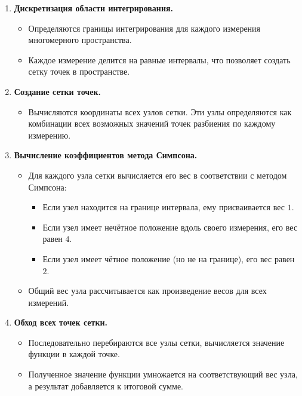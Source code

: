 \documentclass{report}
\begin{document}
\begin{enumerate}
    \item \textbf{Дискретизация области интегрирования.}
    \begin{itemize}
        \item Определяются границы интегрирования для каждого измерения многомерного пространства.
        \item Каждое измерение делится на равные интервалы, что позволяет создать сетку точек в пространстве.
    \end{itemize}

    \item \textbf{Создание сетки точек.}
    \begin{itemize}
        \item Вычисляются координаты всех узлов сетки. Эти узлы определяются как комбинации всех возможных значений точек разбиения по каждому измерению.
    \end{itemize}

    \item \textbf{Вычисление коэффициентов метода Симпсона.}
    \begin{itemize}
        \item Для каждого узла сетки вычисляется его вес в соответствии с методом Симпсона:
        \begin{itemize}
            \item Если узел находится на границе интервала, ему присваивается вес \( 1 \).
            \item Если узел имеет нечётное положение вдоль своего измерения, его вес равен \( 4 \).
            \item Если узел имеет чётное положение (но не на границе), его вес равен \( 2 \).
        \end{itemize}
        \item Общий вес узла рассчитывается как произведение весов для всех измерений.
    \end{itemize}

    \item \textbf{Обход всех точек сетки.}
    \begin{itemize}
        \item Последовательно перебираются все узлы сетки, вычисляется значение функции в каждой точке.
        \item Полученное значение функции умножается на соответствующий вес узла, а результат добавляется к итоговой сумме.
    \end{itemize}


\end{enumerate}
\end{document}

